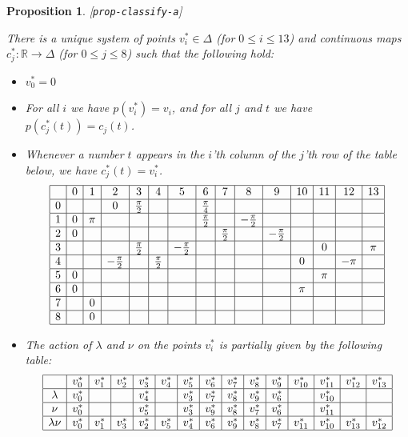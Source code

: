 \documentclass[reqno]{amsart}
\newcommand{\lbl}[1]{\label{#1}\textup{[\texttt{#1}]}\par}
\newcommand{\lbl}{\label}
\newcommand{\Dl}        {\Delta}
\newcommand{\lm}        {\lambda}
\newcommand{\R}         {{\mathbb{R}}}
\newcommand{\ppi}       {\tfrac{\pi}{2}}
\renewcommand{\:}{\colon}
\newtheorem{proposition}[theorem]{Proposition}
\theoremstyle{definition}
\begin{document}
\begin{proposition}\lbl{prop-classify-a}
 There is a unique system of points $v_i^*\in\Dl$ (for $0\leq i\leq
 13$) and continuous maps $c_j^*\:\R\to\Dl$ (for $0\leq j\leq 8$) such
 that the following hold:
 \begin{itemize}
  \item[(a)] $v_0^*=0$
  \item[(b)] For all $i$ we have $p(v_i^*)=v_i$, and for all $j$ and
   $t$ we have $p(c_j^*(t))=c_j(t)$.
  \item[(c)] Whenever a number $t$ appears in the $i$'th column of the
   $j$'th row of the table below, we have $c^*_j(t)=v_i^*$.
   \[ \begin{array}{|c|c|c|c|c|c|c|c|c|c|c|c|c|c|c|}
    \hline
   &0&1&2&3&4&5&6&7&8&9&10&11&12&13\\ \hline
    0&&&0&\ppi&&&\tfrac{\pi}{4}&&&&&&&\\ \hline
    1&0&\pi&&&&&\ppi&&-\ppi&&&&&\\ \hline
    2&0&&&&&&&\ppi&&-\ppi&&&&\\ \hline
    3&&&&\ppi&&-\ppi&&&&&&0&&\pi\\ \hline
    4&&&-\ppi&&\ppi&&&&&&0&&-\pi&\\ \hline
    5&0&&&&&&&&&&&\pi&&\\ \hline
    6&0&&&&&&&&&&\pi&&&\\ \hline
    7&&0&&&&&&&&&&&&\\ \hline
    8&&0&&&&&&&&&&&&\\ \hline
   \end{array} \]
  \item[(d)] The action of $\lm$ and $\nu$ on the points $v_i^*$ is
   partially given by the following table:
   \[ \begin{array}{|c|c|c|c|c|c|c|c|c|c|c|c|c|c|c|}
    \hline
     &v_0^*&v^*_1&v^*_2&v^*_3&v^*_4&v^*_5&v^*_6&v^*_7&v^*_8&v^*_9&
      v^*_{10}&v^*_{11}&v^*_{12}&v^*_{13}\\ \hline
     \lm & v^*_0 & & & v^*_4 & & v^*_3 &
           v^*_7 & v^*_8 & v^*_9 & v^*_6 & & v^*_{10} & & \\ \hline
     \nu & v^*_0 & & & v^*_5 & & v^*_3 &
           v^*_9 & v^*_8 & v^*_7 & v^*_6 & & v^*_{11} & & \\ \hline
     \lm\nu & v^*_0 & v^*_1 & v^*_3 & v^*_2 & v^*_5 & v^*_4 &
           v^*_6 & v^*_9 & v^*_8 & v^*_7 &
           v^*_{11} & v^*_{10} & v^*_{13} & v^*_{12} \\ \hline
   \end{array} \]

\end{itemize}
\end{proposition}
\end{document}
